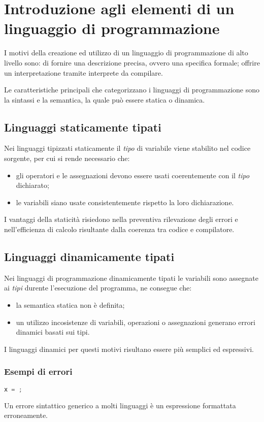 \chapter{Introduzione agli elementi di un linguaggio di programmazione}\label{ch:elementi}
I motivi della creazione ed utilizzo di un linguaggio di programmazione di
alto livello sono:
di fornire una descrizione precisa, ovvero una specifica formale;
offrire un interpretazione tramite interprete da compilare.

Le caratteristiche principali che categorizzano i linguaggi di
programmazione sono la sintassi e la semantica, la quale può essere
statica o dinamica.

\section{Linguaggi staticamente tipati}
Nei linguaggi tipizzati staticamente il \emph{tipo} di variabile viene
stabilito nel codice sorgente, per cui si rende necessario che:

\begin{itemize}
  \item gli operatori e le assegnazioni devono essere usati coerentemente
    con il \emph{tipo} dichiarato;
  \item le variabili siano usate consistentemente rispetto la loro
    dichiarazione.
\end{itemize}

I vantaggi della staticità risiedono nella preventiva rilevazione degli
errori e nell'efficienza di calcolo risultante dalla coerenza tra codice
e compilatore.

\section{Linguaggi dinamicamente tipati}
Nei linguaggi di programmazione dinamicamente tipati le variabili sono
assegnate ai \emph{tipi} durente l'esecuzione del programma, ne consegue
che:
\begin{itemize}
  \item la semantica statica non è definita;
  \item un utilizzo incosistenze di variabili, operazioni o assegnazioni
    generano errori dinamici basati sui tipi.
\end{itemize}

I linguaggi dinamici per questi motivi risultano essere più semplici
ed espressivi.

\subsection{Esempi di errori}
\begin{lstlisting}[language=Java, caption={Errore di sintassi}]
x = ;
\end{lstlisting}
Un errore sintattico generico a molti linguaggi è un espressione
formattata erroneamente.


